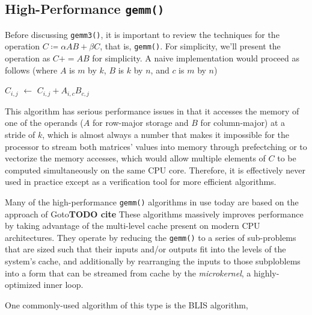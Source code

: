 \documentclass[12pt]{article}
\newcommand*\Let[2]{\State #1 $\gets$ #2}
\newcommand{\pluseq}{\mathrel{{+}{=}}}
\newcommand{\gemmt}{{\texttt{gemm3()}}}
\newcommand{\gemm}{{\texttt{gemm()}}}
\begin{document}
\subsection{High-Performance \gemm{}}
Before discussing \gemmt{}, it is important to review the techniques for the operation $C \coloneqq \alpha AB + \beta C$, that is, \gemm{}.
For simplicity, we'll present the operation as $C \pluseq AB$ for simplicity.
A naive implementation would proceed as follows (where $A$ is $m$ by $k$, $B$ is $k$ by $n$, and $c$ is $m$ by $n$)
\begin{algorithm}
  \caption{Naive implementation of \gemm{}}
  \begin{algorithmic}[1]
    \Let{$C_{i, j}$}{$C_{i, j} + A_{i, c} B_{c, j}$}
    \EndFor{}
    \EndFor{}
    \EndFor{}
    \EndProcedure{}
  \end{algorithmic}
\end{algorithm}
This algorithm has serious performance issues in that it accesses the memory of one of the operands ($A$ for row-major storage and $B$ for column-major) at a stride of $k$, which is almost always a number that makes it impossible for the processor to stream both matrices' values into memory through prefectching or to vectorize the memory accesses, which would allow multiple elements of $C$ to be computed simultaneously on the same CPU core.
Therefore, it is effectively never used in practice except as a verification tool for more efficient algorithms.

Many of the high-performance \gemm{} algorithms in use today are based on the approach of Goto\textbf{TODO cite}
These algorithms massively improves performance by taking advantage of the multi-level cache present on modern CPU architectures.
They operate by reducing the \gemm{} to a series of sub-problems that are sized such that their inputs and/or outputs fit into the levels of the system's cache, and additionally by rearranging the inputs to those subploblems into a form that can be streamed from cache by the \emph{microkernel}, a highly-optimized inner loop.

One commonly-used algorithm of this type is the BLIS algorithm,
\end{document}

